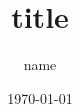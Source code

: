 \documentclass{jarticle}
\begin{document}
\begin{titlepage}
  \title{ title }
  \author{ name }
  \date{ \today }
\end{titlepage}

\maketitle

\section{}
\end{document}
